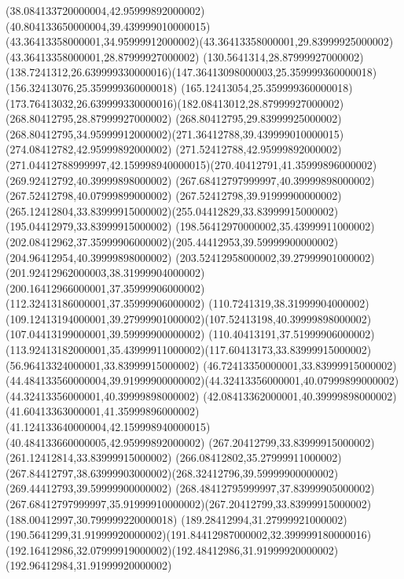 {{	\moveto(38.084133720000004,42.95999892000002)
	\curveto(40.804133650000004,39.439999010000015)(43.36413358000001,34.95999912000002)(43.36413358000001,29.83999925000002)
	\lineto(43.36413358000001,28.87999927000002)
	\lineto(130.5641314,28.87999927000002)
	\curveto(138.7241312,26.639999330000016)(147.36413098000003,25.359999360000018)(156.32413076,25.359999360000018)
	\curveto(165.12413054,25.359999360000018)(173.76413032,26.639999330000016)(182.08413012,28.87999927000002)
	\lineto(268.80412795,28.87999927000002)
	\lineto(268.80412795,29.83999925000002)
	\curveto(268.80412795,34.95999912000002)(271.36412788,39.439999010000015)(274.08412782,42.95999892000002)
	\lineto(271.52412788,42.95999892000002)
	\curveto(271.04412788999997,42.159998940000015)(270.40412791,41.35999896000002)(269.92412792,40.39999898000002)
	\lineto(267.68412797999997,40.39999898000002)
	\lineto(267.52412798,40.07999899000002)
	\curveto(267.52412798,39.91999900000002)(265.12412804,33.83999915000002)(255.04412829,33.83999915000002)
	\lineto(195.04412979,33.83999915000002)
	\curveto(198.56412970000002,35.43999911000002)(202.08412962,37.35999906000002)(205.44412953,39.59999900000002)
	\lineto(204.96412954,40.39999898000002)
	\curveto(203.52412958000002,39.27999901000002)(201.92412962000003,38.31999904000002)(200.16412966000001,37.35999906000002)
	\lineto(112.32413186000001,37.35999906000002)
	\curveto(110.7241319,38.31999904000002)(109.12413194000001,39.27999901000002)(107.52413198,40.39999898000002)
	\lineto(107.04413199000001,39.59999900000002)
	\curveto(110.40413191,37.51999906000002)(113.92413182000001,35.43999911000002)(117.60413173,33.83999915000002)
	\lineto(56.96413324000001,33.83999915000002)
	\curveto(46.72413350000001,33.83999915000002)(44.484133560000004,39.91999900000002)(44.32413356000001,40.07999899000002)
	\lineto(44.32413356000001,40.39999898000002)
	\lineto(42.08413362000001,40.39999898000002)
	\curveto(41.60413363000001,41.35999896000002)(41.124133640000004,42.159998940000015)(40.484133660000005,42.95999892000002)
	\closepath
	\moveto(267.20412799,33.83999915000002)
	\lineto(261.12412814,33.83999915000002)
	\curveto(266.08412802,35.27999911000002)(267.84412797,38.63999903000002)(268.32412796,39.59999900000002)
	\lineto(269.44412793,39.59999900000002)
	\curveto(268.48412795999997,37.83999905000002)(267.68412797999997,35.91999910000002)(267.20412799,33.83999915000002)
	\closepath
	\moveto(188.00412997,30.799999220000018)
	\curveto(189.28412994,31.27999921000002)(190.5641299,31.91999920000002)(191.84412987000002,32.399999180000016)
	\curveto(192.16412986,32.07999919000002)(192.48412986,31.91999920000002)(192.96412984,31.91999920000002)
}}
